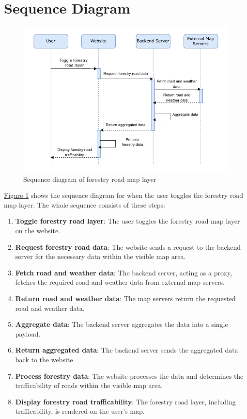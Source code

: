 \section{Sequence Diagram}
\begin{figure}[h]
    \centering
    \includegraphics[width=1\linewidth]{figures/sequence_diagram.pdf}
    \caption{Sequence diagram of forestry road map layer}
    \label{fig:sequence_diagram}
\end{figure}

\hyperref[fig:sequence_diagram]{Figure \ref*{fig:sequence_diagram}} shows the sequence diagram for when the user toggles the forestry road map layer. The whole sequence consists of these steps:
\begin{enumerate}
    \item \textbf{Toggle forestry road layer}: The user toggles the forestry road map layer on the website.
    \item \textbf{Request forestry road data}: The website sends a request to the backend server for the necessary data within the visible map area.
    \item \textbf{Fetch road and weather data}: The backend server, acting as a proxy, fetches the required road and weather data from external map servers.
    \item \textbf{Return road and weather data}: The map servers return the requested road and weather data.
    \item \textbf{Aggregate data}: The backend server aggregates the data into a single payload.
    \item \textbf{Return aggregated data}: The backend server sends the aggregated data back to the website.
    \item \textbf{Process forestry data}: The website processes the data and determines the trafficability of roads within the visible map area.
    \item \textbf{Display forestry road trafficability}: The forestry road layer, including trafficability, is rendered on the user's map.
\end{enumerate}

